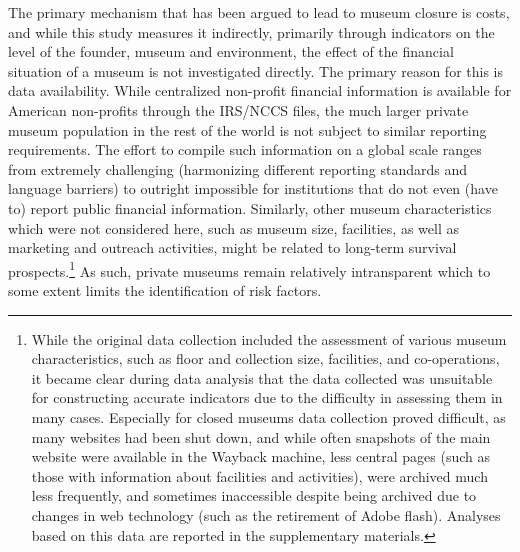 \documentclass[12pt]{article}
\begin{document}
The primary mechanism that has been argued to lead to museum closure is costs, and while this study measures it indirectly, primarily through indicators on the level of the founder, museum and environment, the effect of the financial situation of a museum is not investigated directly.
The primary reason for this is data availability.
While centralized non-profit financial information is available for American non-profits through the IRS/NCCS files, the much larger private museum population in the rest of the world is not subject to similar reporting requirements.
The effort to compile such information on a global scale ranges from extremely challenging (harmonizing different reporting standards and language barriers) to outright impossible for institutions that do not even (have to) report public financial information.
Similarly, other museum characteristics which were not considered here, such as museum size, facilities, as well as marketing and outreach activities, might be related to long-term survival prospects.\footnote{While the original data collection included the assessment of various museum characteristics, such as floor and collection size, facilities, and co-operations, it became clear during data analysis that the data collected was unsuitable for constructing accurate indicators due to the difficulty in assessing them in many cases. Especially for closed museums data collection proved difficult, as many websites had been shut down, and while often snapshots of the main website were available in the Wayback machine, less central pages (such as those with information about facilities and activities), were archived much less frequently, and sometimes inaccessible despite being archived due to changes in web technology (such as the retirement of Adobe flash). Analyses based on this data are reported in the supplementary materials.}
As such, private museums remain relatively intransparent which to some extent limits the identification of risk factors. 
\end{document}
